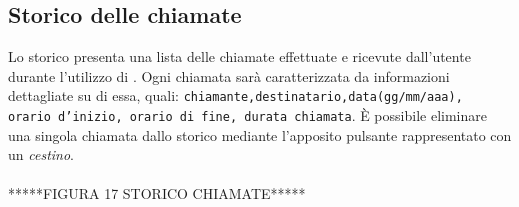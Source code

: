 \subsection{Storico delle chiamate}
Lo storico presenta una lista delle chiamate effettuate e ricevute dall'utente durante l'utilizzo di \caName{}. Ogni chiamata sarà caratterizzata da informazioni dettagliate su di essa, quali: \texttt{chiamante,destinatario,data(gg/mm/aaa), orario d'inizio, orario di fine, durata chiamata}.
È possibile eliminare una singola chiamata dallo storico mediante l'apposito pulsante rappresentato con un \textit{cestino}.
\\\\*****FIGURA 17 STORICO CHIAMATE*****




